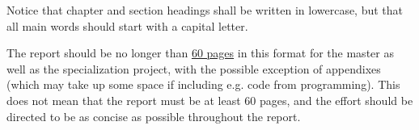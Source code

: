 \documentclass[../Main/thesis.tex]{subfiles}
\begin{document}
\begin{remark}
Notice that chapter and section headings shall be written in lowercase, but that all main words should start with a capital letter.
\end{remark}



The report should be no longer than \underline{60 pages} in this format for the master as well as the specialization project, with the possible exception of appendixes (which may take up some space if including e.g. code from programming). 
This does not mean that the report must be at least 60 pages, and the effort should be directed to be as concise as possible throughout the report.

\blankpage
\end{document}
